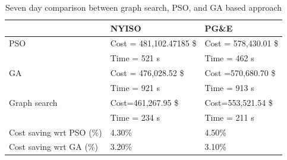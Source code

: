 \begin{table}
\caption{Seven day comparison between graph search, PSO, and GA based approach}
\label{tab:Cost_MULTI}
\begin{tabular}{l|l|l|}
\cline{2-3}
                                                        & NYISO                   & PG\&E                \\ \hline
\multicolumn{1}{|l|}{PSO}                               & Cost = 481,102.47185 \$ & Cost = 578,430.01 \$ \\ 
\multicolumn{1}{|l|}{}                                  & Time = 521 s            & Time = 462 s         \\ \hline
\multicolumn{1}{|l|}{GA}                                & Cost = 476,028.52 \$    & Cost =570,680.70 \$  \\ 
\multicolumn{1}{|l|}{}                                  & Time = 921 s            & Time = 913 s         \\ \hline
\multicolumn{1}{|l|}{Graph search}                      & Cost=461,267.95 \$      & Cost=553,521.54 \$   \\ 
\multicolumn{1}{|c|}{}                                  & Time = 234 s          & Time = 211 s       \\ \hline
\multicolumn{1}{|l|}{Cost saving wrt PSO (\%)} & 4.30\%                  & 4.50\%               \\ \hline
\multicolumn{1}{|l|}{Cost saving wrt GA (\%)}  & 3.20\%                  & 3.10\%               \\ \hline
\end{tabular}
\end{table}

